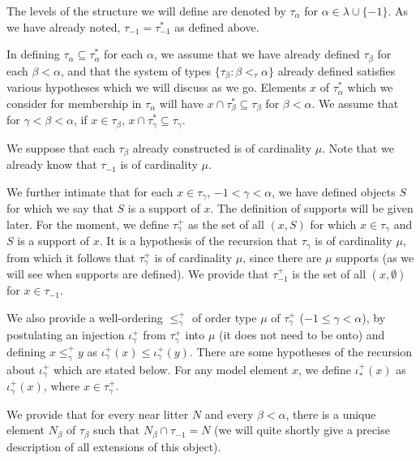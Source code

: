 \documentclass[112pt]{article}
\begin{document}
The levels of the structure we will define are denoted by $\tau_\alpha$ for \newline $\alpha \in \lambda \cup \{-1\}$.  As we have already noted, $\tau_{-1}=\tau^*_{-1}$ as defined above.

In defining $\tau_\alpha \subseteq \tau^*_\alpha$ for each $\alpha$, we assume that we have already defined $\tau_\beta$ for each $\beta<\alpha$, and that the system of types $\{\tau_\beta:\beta <_\tau \alpha\}$ already defined satisfies various hypotheses which we will discuss as we go.
Elements $x$ of $\tau^*_\alpha$ which we consider for membership in $\tau_\alpha$ will have $x \cap \tau^*_\beta \subseteq \tau_\beta$ for $\beta<\alpha$.  We assume that for $\gamma<\beta<\alpha$, if $x \in \tau_\beta$, $x \cap \tau^*_\gamma \subseteq \tau_\gamma$.

We suppose that each $\tau_\beta$ already constructed is of cardinality $\mu$.  Note that we already know that
$\tau_{-1}$ is of cardinality $\mu$.


We further intimate that for each $x \in \tau_\gamma$, $-1<\gamma<\alpha$, we have defined objects $S$ for which we say that $S$ is a support of $x$.  The definition of supports will be given later.  For the moment, we define $\tau_\gamma^+$ as the set of all $(x,S)$ for which $x \in \tau_\gamma$ and $S$ is a support of $x$.  It is a hypothesis of the recursion
that $\tau_\gamma$ is of cardinality $\mu$, from which it follows that  $\tau^+_\gamma$ is of cardinality $\mu$, since there are $\mu$ supports (as we will see when supports are defined). We provide that $\tau_{-1}^+$ is the set
of all $(x,\emptyset)$ for $x \in \tau_{-1}$.  

We also provide a well-ordering $\leq^+_\gamma$ of order type $\mu$ of $\tau_\gamma^+$ ($-1 \leq \gamma <\alpha$), by postulating an injection $\iota^+_\gamma$ from $\tau_\gamma^+$ into $\mu$ (it does not need to be onto) and defining $x \leq^+_\gamma y$ as $\iota^+_\gamma(x) \leq \iota^+_\gamma(y)$.   There are some hypotheses of the recursion about $\iota^+_\gamma$ which are stated below.   For any model element $x$, we define $\iota^+_*(x)$ as $\iota^+_\gamma(x)$, where $x \in \tau_\gamma^+$.


We provide that for every near litter $N$ and every $\beta<\alpha$, there is a unique element $N_\beta$ of $\tau_\beta$ such that $N_\beta \cap \tau_{-1}=N$ (we will quite shortly give a precise description of all extensions of this object).
\end{document}
